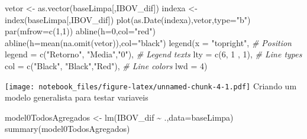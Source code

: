 \documentclass[
]{article}
\newenvironment{Shaded}{\begin{snugshade}}{\end{snugshade}}
\newcommand{\AttributeTok}[1]{\textcolor[rgb]{0.77,0.63,0.00}{#1}}
\newcommand{\CommentTok}[1]{\textcolor[rgb]{0.56,0.35,0.01}{\textit{#1}}}
\newcommand{\DecValTok}[1]{\textcolor[rgb]{0.00,0.00,0.81}{#1}}
\newcommand{\FunctionTok}[1]{\textcolor[rgb]{0.00,0.00,0.00}{#1}}
\newcommand{\NormalTok}[1]{#1}
\newcommand{\OtherTok}[1]{\textcolor[rgb]{0.56,0.35,0.01}{#1}}
\newcommand{\SpecialCharTok}[1]{\textcolor[rgb]{0.00,0.00,0.00}{#1}}
\newcommand{\StringTok}[1]{\textcolor[rgb]{0.31,0.60,0.02}{#1}}
\begin{document}
\begin{Shaded}
\begin{Highlighting}[]
\NormalTok{vetor }\OtherTok{\textless{}{-}} \FunctionTok{as.vector}\NormalTok{(baseLimpa[,}\StringTok{\textquotesingle{}IBOV\_dif\textquotesingle{}}\NormalTok{])}
\NormalTok{indexa }\OtherTok{\textless{}{-}} \FunctionTok{index}\NormalTok{(baseLimpa[,}\StringTok{\textquotesingle{}IBOV\_dif\textquotesingle{}}\NormalTok{])}
\FunctionTok{plot}\NormalTok{(}\FunctionTok{as.Date}\NormalTok{(indexa),vetor,}\AttributeTok{type=}\StringTok{"b"}\NormalTok{)}
\FunctionTok{par}\NormalTok{(}\AttributeTok{mfrow=}\FunctionTok{c}\NormalTok{(}\DecValTok{1}\NormalTok{,}\DecValTok{1}\NormalTok{))}
\FunctionTok{abline}\NormalTok{(}\AttributeTok{h=}\DecValTok{0}\NormalTok{,}\AttributeTok{col=}\StringTok{"red"}\NormalTok{)}
\FunctionTok{abline}\NormalTok{(}\AttributeTok{h=}\FunctionTok{mean}\NormalTok{(}\FunctionTok{na.omit}\NormalTok{(vetor)),}\AttributeTok{col=}\StringTok{"black"}\NormalTok{)}
\FunctionTok{legend}\NormalTok{(}\AttributeTok{x =} \StringTok{"topright"}\NormalTok{,         }\CommentTok{\# Position}
       \AttributeTok{legend =} \FunctionTok{c}\NormalTok{(}\StringTok{"Retorno"}\NormalTok{, }\StringTok{"Media"}\NormalTok{,}\StringTok{"0"}\NormalTok{), }\CommentTok{\# Legend texts}
       \AttributeTok{lty =} \FunctionTok{c}\NormalTok{(}\DecValTok{6}\NormalTok{, }\DecValTok{1}\NormalTok{ , }\DecValTok{1}\NormalTok{),          }\CommentTok{\# Line types}
       \AttributeTok{col =} \FunctionTok{c}\NormalTok{(}\StringTok{"Black"}\NormalTok{, }\StringTok{"Black"}\NormalTok{,}\StringTok{"Red"}\NormalTok{),          }\CommentTok{\# Line colors}
       \AttributeTok{lwd =} \DecValTok{4}\NormalTok{)}
\end{Highlighting}
\end{Shaded}

\texttt{[image: notebook\_files/figure-latex/unnamed-chunk-4-1.pdf]}
Criando um modelo generalista para testar variaveis

\begin{Shaded}
\begin{Highlighting}[]
\NormalTok{model0TodosAgregados }\OtherTok{\textless{}{-}} \FunctionTok{lm}\NormalTok{(IBOV\_dif }\SpecialCharTok{\textasciitilde{}}\NormalTok{ .,}\AttributeTok{data=}\NormalTok{baseLimpa)}
\FunctionTok{summary}\NormalTok{(model0TodosAgregados)}
\end{Highlighting}
\end{Shaded}
\end{document}
